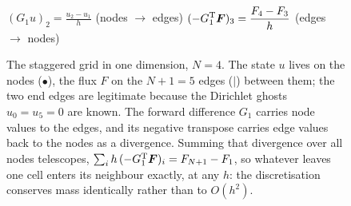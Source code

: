 \documentclass[a5paper]{article}
\begin{document}
\begin{figure}[h!]
    \centering
    \\[4pt]
    {\footnotesize
    $\displaystyle (G_1u)_2=\frac{u_2-u_1}{h}$ \quad(nodes $\to$ edges)
    \hspace{0.9cm}
    $\displaystyle (-G_1^{\mathrm{T}}\boldsymbol F)_3=\frac{F_4-F_3}{h}$ \quad(edges $\to$ nodes)}
    \caption{\footnotesize The staggered grid in one dimension, $N=4$. The state $u$ lives on the nodes ($\bullet$), the flux $F$ on the $N+1=5$ edges ($|$) between them; the two end edges are legitimate because the Dirichlet ghosts $u_0=u_5=0$ are known. The forward difference $G_1$ carries node values to the edges, and its negative transpose carries edge values back to the nodes as a divergence. Summing that divergence over all nodes telescopes, $\sum_i h\,(-G_1^{\mathrm{T}}\boldsymbol F)_i = F_{N+1}-F_1$, so whatever leaves one cell enters its neighbour exactly, at any $h$: the discretisation conserves mass identically rather than to $O(h^2)$.}
    \label{fig:staggered-grid}
\end{figure}
\end{document}
